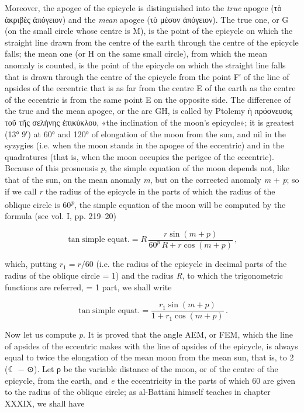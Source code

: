 \documentclass[11pt]{article}
\newcommand{\Pg}[1]{\marginpar{\footnotesize\color{gray}#1}}
\begin{document}
\par \Pg{II 224}Moreover, the apogee of the epicycle is distinguished into the \emph{true} apogee ({\greekfont τὸ ἀκριβὲς ἀπόγειον}) and the \emph{mean} apogee ({\greekfont τὸ μέσον ἀπόγειον}). The true one, or G (on the small circle whose centre is M), is the point of the epicycle on which the straight line drawn from the centre of the earth through the centre of the epicycle falls; the mean one (or H on the same small circle), from which the mean anomaly is counted, is the point of the epicycle on which the straight line falls that is drawn through the centre of the epicycle from the point F′ of the line of apsides of the eccentric that is as far from the centre E of the earth as the centre of the eccentric is from the same point E on the opposite side. The difference of the true and the mean apogee, or the arc GH, is called by Ptolemy {\greekfont ἡ πρόσνευσις τοῦ τῆς σελήνης ἐπικύκλου}, «the inclination of the moon's epicycle»; it is greatest (13° 9′) at 60° and 120° of elongation of the moon from the sun, and nil in the syzygies (i.e. when the moon stands in the apogee of the eccentric) and in the quadratures (that is, when the moon occupies the perigee of the eccentric). Because of this prosneusis \emph{p}, the simple equation of the moon depends not, like that of the sun, on the mean anomaly \emph{m}, but on the corrected anomaly \emph{m} + \emph{p}; so if we call \emph{r} the radius of the epicycle in the parts of which the radius of the oblique circle is 60\textsuperscript{\itshape p}, the simple equation of the moon will be computed by the formula (see vol. I, pp. 219–20)\par
\begin{center}\end{center}
\par\smallskip\[\tan \text{simple equat.} = R\,\dfrac{r \sin (m + p)}{60^{p}\,R + r \cos (m + p)}\,,\]\par\smallskip
\par which, putting $r_1 = r/60$ (i.e. the radius of the epicycle in decimal parts of the radius of the oblique circle = 1) and the radius \emph{R}, to which the trigonometric functions are referred, = 1 part, we shall write\par
\par\smallskip\[\tan \text{simple equat.} = \dfrac{r_1 \sin (m + p)}{1 + r_1 \cos (m + p)}\,.\]\par\smallskip
\par Now let us compute \emph{p}. It is proved that the angle AEM, or FEM, which the line of apsides of the eccentric makes with the line of apsides of the epicycle, is always equal to twice the elongation of the mean moon from the mean sun, that is, to 2 ({\MoonFont\upshape ☾} − {\MoonFont\upshape ⊙}). Let {\greekfont ρ} be the variable distance of the moon, or of the centre of the epicycle, from the earth, and \emph{e} the eccentricity in the parts of which 60 are given to the radius of the oblique circle; as al-Battānī himself teaches in chapter XXXIX, we shall have\par
\end{document}
